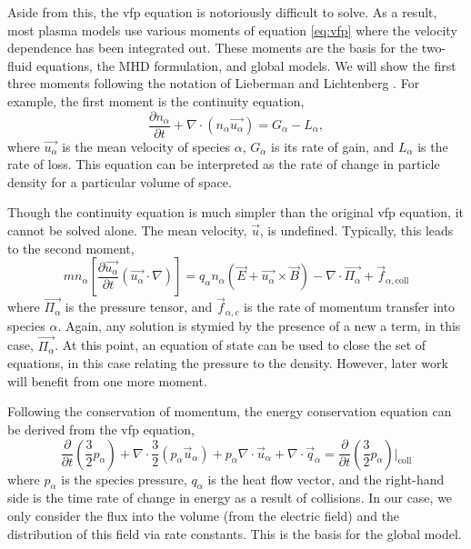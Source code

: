 Aside from this, the \acs{vfp} equation is notoriously difficult to solve. As a
result, most plasma models use various moments of equation \ref{eq:vfp} where the
velocity dependence has been integrated out. These moments are the basis for the
two-fluid equations, the MHD formulation, and global models. We will show the
first three moments following the notation of Lieberman and Lichtenberg
\cite{Lieberman2005}. For example, the first moment is the continuity equation,
\begin{equation}\label{eq:cont}
  \frac{\partial n_\alpha}{\partial t} + \nabla \cdot (n_\alpha \vec{u_\alpha})
  = G_\alpha - L_\alpha,
\end{equation}
where $\vec{u_\alpha}$ is the mean velocity of species $\alpha$, $G_\alpha$ is
its rate of gain, and $L_\alpha$ is the rate of loss. This equation can be
interpreted as the rate of change in particle density for a particular volume of
space.

Though the continuity equation is much simpler than the original \acs{vfp}
equation, it cannot be solved alone. The mean velocity, $\vec{u}$, is undefined.
Typically, this leads to the second moment, 
\begin{equation}\label{eq:mom}
  mn_\alpha\left[\frac{\partial \vec{u_\alpha}}{\partial t}
  (\vec{u_\alpha}\cdot \nabla)\right] = q_\alpha n_\alpha(\vec{E} +
  \vec{u_\alpha} \times \vec{B}) - \nabla \cdot \vec{\Pi_\alpha} +
  \vec{f}_{\alpha,\mathrm{coll}}
\end{equation}
where $\vec{\Pi_\alpha}$ is the pressure tensor, and $\vec{f}_{\alpha,c}$ is the
rate of momentum transfer into species $\alpha$. Again, any solution is stymied
by the presence of a new a term, in this case, $\vec{\Pi_\alpha}$. At this
point, an equation of state can be used to close the set of equations, in this
case relating the pressure to the density. However, later work will benefit from
one more moment.

Following the conservation of momentum, the energy conservation equation can be
derived from the \acs{vfp} equation,
\begin{equation}
  \frac{\partial}{\partial t}\left(\frac{3}{2}p_\alpha\right) 
  + \nabla\cdot\frac{3}{2} (p_\alpha\vec{u}_\alpha)
  + p_\alpha\nabla\cdot\vec{u}_\alpha
  + \nabla\cdot\vec{q}_\alpha
  = \frac{\partial}{\partial
  t}\left(\frac{3}{2}p_\alpha\right)\bigg|_\mathrm{coll}
\end{equation}
where $p_\alpha$ is the species pressure, $q_\alpha$ is the heat flow vector,
and the right-hand side is the time rate of change in energy as a result of
collisions. In our case, we only consider the flux into the volume (from the
electric field) and the distribution of this field via rate constants. This is
the basis for the global model.

